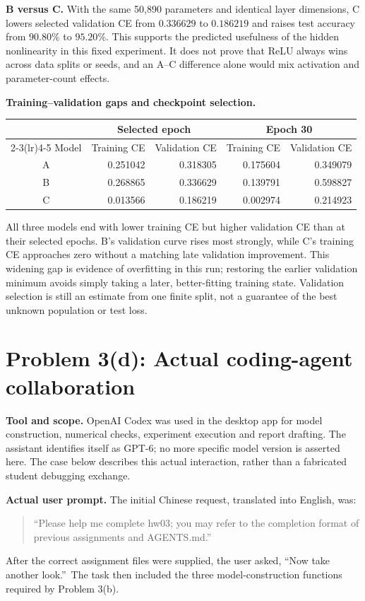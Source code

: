\documentclass[11pt,a4paper]{article}
\begin{document}
\textbf{B versus C.} With the same 50,890 parameters and identical layer dimensions, C lowers selected validation CE from $0.336629$ to $0.186219$ and raises test accuracy from $90.80\%$ to $95.20\%$. This supports the predicted usefulness of the hidden nonlinearity in this fixed experiment. It does not prove that ReLU always wins across data splits or seeds, and an A--C difference alone would mix activation and parameter-count effects.

\textbf{Training--validation gaps and checkpoint selection.}
\begin{center}
\small
\begin{tabular}{crrrr}
\toprule
& \multicolumn{2}{c}{Selected epoch} & \multicolumn{2}{c}{Epoch 30}\\
\cmidrule(lr){2-3}\cmidrule(lr){4-5}
Model & Training CE & Validation CE & Training CE & Validation CE\\
\midrule
A & 0.251042 & 0.318305 & 0.175604 & 0.349079\\
B & 0.268865 & 0.336629 & 0.139791 & 0.598827\\
C & 0.013566 & 0.186219 & 0.002974 & 0.214923\\
\bottomrule
\end{tabular}
\end{center}
All three models end with lower training CE but higher validation CE than at their selected epochs. B's validation curve rises most strongly, while C's training CE approaches zero without a matching late validation improvement. This widening gap is evidence of overfitting in this run; restoring the earlier validation minimum avoids simply taking a later, better-fitting training state. Validation selection is still an estimate from one finite split, not a guarantee of the best unknown population or test loss.

\clearpage
\section*{Problem 3(d): Actual coding-agent collaboration}
\textbf{Tool and scope.} OpenAI Codex was used in the desktop app for model construction, numerical checks, experiment execution and report drafting. The assistant identifies itself as GPT-6; no more specific model version is asserted here. The case below describes this actual interaction, rather than a fabricated student debugging exchange.

\textbf{Actual user prompt.} The initial Chinese request, translated into English, was:
\begin{quote}
\textquotedblleft Please help me complete hw03; you may refer to the completion format of previous assignments and AGENTS.md.\textquotedblright
\end{quote}
After the correct assignment files were supplied, the user asked, \textquotedblleft Now take another look.\textquotedblright\ The task then included the three model-construction functions required by Problem 3(b).
\end{document}
